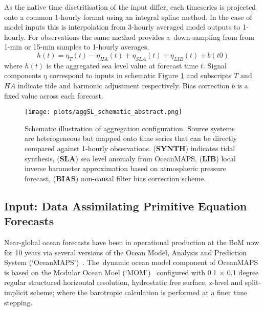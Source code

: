 \documentclass[jmse,article,accept,moreauthors,pdftex,10pt,a4paper]{mdpi}
\begin{document}
As the native time disctritisation of the input differ, each timeseries is projected onto a common 1-hourly format using an integral spline method.  
In the case of model inputs this is interpolation from 3-hourly averaged model outputs to 1-hourly.  
For observations the same method provides a~down-sampling from from 1-min or 15-min samples to 1-hourly averages.  
\begin{equation}
h(t) = \eta_{T}(t) - \eta_{HA}(t) + \eta_{SLA}(t) + \eta_{LIB}(t) + b(t0)
\label{eq:aggSL}
\end{equation}
where $h(t)$ is the aggregated sea level value at forecast time $t$.  
Signal components $\eta$ correspond to inputs in schematic Figure \ref{fig:aggSL} and subscripts $T$ and $HA$ indicate tide and harmonic adjustment respectively.    
Bias correction $b$ is a fixed value across each forecast.
\vspace{6pt}
\begin{figure}[H]
\centering
\texttt{[image: plots/aggSL\_schematic\_abstract.png]}
\caption{Schematic illustration of aggregation configuration.  Source systems are heterogeneous but mapped onto time series that can be directly compared against 1-hourly observations.  (\textbf{SYNTH}) indicates tidal synthesis, (\textbf{SLA}) sea level anomaly from OceanMAPS, (\textbf{LIB}) local inverse barometer approximation based on atmospheric pressure forecast, (\textbf{BIAS}) non-causal filter bias correction scheme. }
\label{fig:aggSL}
\end{figure}   



\subsection{ Input: Data Assimilating Primitive Equation Forecasts }
\label{sec:dynamicmodels}

Near-global ocean forecasts have been in operational production at the BoM now for 10 years via several versions of the Ocean Model, Analysis and Prediction System (`OceanMAPS')~\cite{Brassington:2007ut,NMOC:2007wq,BureauofMeterology:2011ta,Brassington:2012wm}.
The~dynamic ocean model component of OceanMAPS is based on the Modular Ocean Moel (`MOM')~\cite{Griffies:2008vh} configured with 0.1 $\times$ 0.1 degree regular structured horizontal resolution, hydrostatic free surface, z-level and split-implicit scheme; where the barotropic calculation is performed at a finer time stepping. 
\end{document}
